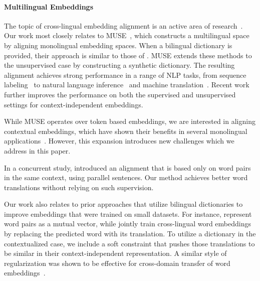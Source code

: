 \documentclass[11pt,a4paper]{article}
\begin{document}
\paragraph{Multilingual Embeddings} The topic of cross-lingual embedding alignment is an active area of research~\cite{mikolov2013exploiting, xing2015normalized, dinu2014improving, lazaridou2015hubness, zhang2017adversarial}. Our work most closely relates to MUSE~\cite{conneau2017word}, which constructs a multilingual space by aligning monolingual embedding spaces. When a bilingual dictionary is provided, their approach is similar to those of \cite{smith2017offline, artetxe2017learning}. MUSE extends these methods to the unsupervised case by constructing a synthetic dictionary.
The resulting alignment achieves strong performance in a range of NLP tasks, from sequence labeling~\cite{lin18multi} to natural language inference~\cite{Conneau18xnli} and machine translation~\cite{lample2018unsupervised, Qi18when}. 
 Recent work further improves the performance on both the supervised \cite{joulin2018loss} and unsupervised \cite{grave2018unsupervised, alvarez2018gromov, hoshen2018non} settings for context-independent embeddings.

While MUSE operates over token based embeddings, we are interested in aligning contextual embeddings, which have shown their benefits in several monolingual applications~\cite{peters_deep_2018, mccann_cove_2017, howard_ulmfit_2018, radford_improving_2018, devlin_bert_2018}. 
However, this expansion introduces new challenges which we address in this paper. 

In a concurrent study, \citet{aldarmaki2019context} introduced an alignment that is based only on word pairs in the same context, using parallel sentences. Our method achieves better word translations without relying on such supervision.





Our work also relates to prior approaches that utilize bilingual dictionaries to improve embeddings that were trained on small datasets. For instance, \citet{xiao2014distributed} represent word pairs as a mutual vector, while \citet{adams2017cross} jointly train cross-lingual word embeddings by replacing the predicted word with its translation.  To utilize a dictionary in the contextualized case, we include a soft constraint that pushes those translations to be similar in their context-independent representation. A similar style of regularization was shown to be effective for cross-domain transfer of word embeddings~\citep{yang2017simple}.
\end{document}
